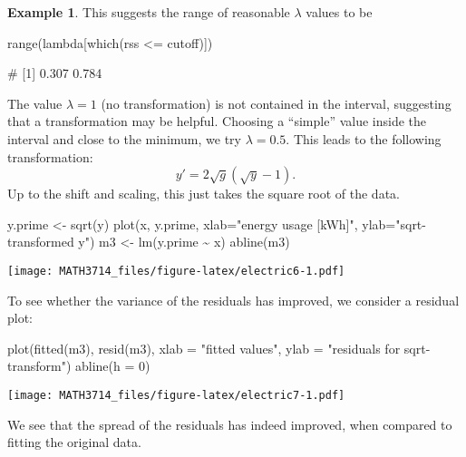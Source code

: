 \documentclass[
  a4paper,
]{article}
\newenvironment{Shaded}{\begin{snugshade}}{\end{snugshade}}
\newcommand{\AttributeTok}[1]{\textcolor[rgb]{0.77,0.63,0.00}{#1}}
\newcommand{\DecValTok}[1]{\textcolor[rgb]{0.00,0.00,0.81}{#1}}
\newcommand{\FunctionTok}[1]{\textcolor[rgb]{0.00,0.00,0.00}{#1}}
\newcommand{\NormalTok}[1]{#1}
\newcommand{\OtherTok}[1]{\textcolor[rgb]{0.56,0.35,0.01}{#1}}
\newcommand{\SpecialCharTok}[1]{\textcolor[rgb]{0.00,0.00,0.00}{#1}}
\newcommand{\StringTok}[1]{\textcolor[rgb]{0.31,0.60,0.02}{#1}}
\theoremstyle{definition}
\theoremstyle{definition}
\newtheorem{example}{Example}[section]
\theoremstyle{definition}
\theoremstyle{definition}
\theoremstyle{remark}
\begin{document}
\begin{example}
This suggests the range of reasonable \(\lambda\) values to be

\begin{Shaded}
\begin{Highlighting}[]
\FunctionTok{range}\NormalTok{(lambda[}\FunctionTok{which}\NormalTok{(rss }\SpecialCharTok{\textless{}=}\NormalTok{ cutoff)])}
\end{Highlighting}
\end{Shaded}

\begin{Shaded}
\begin{Highlighting}[]
\NormalTok{\# [1] 0.307 0.784}
\end{Highlighting}
\end{Shaded}

The value \(\lambda = 1\) (no transformation) is not contained in the interval,
suggesting that a transformation may be helpful.
Choosing a ``simple'' value inside the interval and close to the minimum,
we try \(\lambda = 0.5\). This leads to the following transformation:
\begin{equation*}
  y'
  = 2\sqrt{g} (\sqrt{y}-1).
\end{equation*}
Up to the shift and scaling, this just takes the square root of the data.

\begin{Shaded}
\begin{Highlighting}[]
\NormalTok{y.prime }\OtherTok{\textless{}{-}} \FunctionTok{sqrt}\NormalTok{(y)}
\FunctionTok{plot}\NormalTok{(x, y.prime,}
     \AttributeTok{xlab=}\StringTok{"energy usage [kWh]"}\NormalTok{, }\AttributeTok{ylab=}\StringTok{"sqrt{-}transformed y"}\NormalTok{)}
\NormalTok{m3 }\OtherTok{\textless{}{-}} \FunctionTok{lm}\NormalTok{(y.prime }\SpecialCharTok{\textasciitilde{}}\NormalTok{ x)}
\FunctionTok{abline}\NormalTok{(m3)}
\end{Highlighting}
\end{Shaded}

\texttt{[image: MATH3714\_files/figure-latex/electric6-1.pdf]}

To see whether the variance of the residuals has improved, we consider
a residual plot:

\begin{Shaded}
\begin{Highlighting}[]
\FunctionTok{plot}\NormalTok{(}\FunctionTok{fitted}\NormalTok{(m3), }\FunctionTok{resid}\NormalTok{(m3),}
     \AttributeTok{xlab =} \StringTok{"fitted values"}\NormalTok{, }\AttributeTok{ylab =} \StringTok{"residuals for sqrt{-}transform"}\NormalTok{)}
\FunctionTok{abline}\NormalTok{(}\AttributeTok{h =} \DecValTok{0}\NormalTok{)}
\end{Highlighting}
\end{Shaded}

\texttt{[image: MATH3714\_files/figure-latex/electric7-1.pdf]}

We see that the spread of the residuals has indeed improved, when compared to
fitting the original data.
\end{example}
\end{document}

